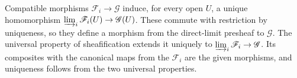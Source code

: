 Compatible morphisms $\mathscr F_i\to\mathscr G$ induce, for every open $U$, a unique homomorphism $\varinjlim_i\mathscr F_i(U)\to\mathscr G(U)$. These commute with restriction by uniqueness, so they define a morphism from the direct-limit presheaf to $\mathscr G$. The universal property of sheafification extends it uniquely to $\varinjlim_i\mathscr F_i\to\mathscr G$. Its composites with the canonical maps from the $\mathscr F_i$ are the given morphisms, and uniqueness follows from the two universal properties.
